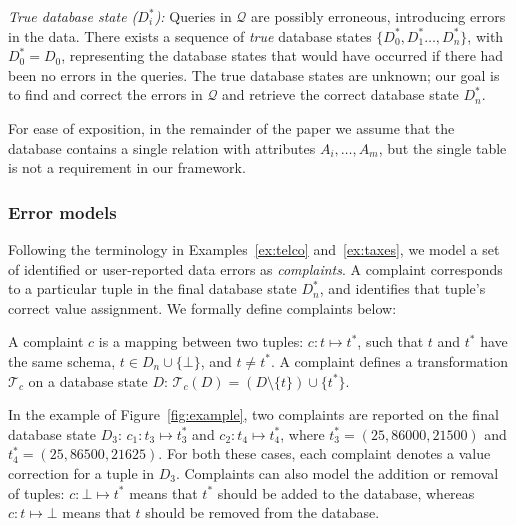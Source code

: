 \smallskip
\noindent
\emph{True database state ($D_i^*$):}
Queries in $\mathcal{Q}$ are possibly erroneous, introducing errors in the
data. There exists a sequence of \emph{true} database states $\{D_0^*,
D_1^*\dots, D_n^*\}$, with $D_0^*=D_0$, representing the database states that
would have occurred if there had been no errors in the queries.
The true database states are unknown; our goal is to find and correct the errors in $\mathcal{Q}$ and retrieve the correct database state $D_n^*$.

For ease of exposition, in the remainder of the paper we assume that the
database contains a single relation with attributes $A_i,\ldots,A_m$,
but the single table is not a requirement in our framework.


\subsubsection*{Error models}

Following the terminology in Examples~\ref{ex:telco}
and~\ref{ex:taxes}, we model a set of identified or user-reported
data errors as \emph{complaints}. A complaint corresponds to a
particular tuple in the final database state $D_n^*$, and identifies
that tuple's correct value assignment. We formally define complaints
below:

\begin{definition}[Complaint]
    A complaint $c$ is a mapping between two tuples: $c: t\mapsto t^*$, such that $t$ and $t^*$ have the same schema, $t\in D_n\cup\{\bot\}$, and $t\neq t^*$. A complaint defines a
    transformation $\mathcal{T}_c$ on a database state $D$: $\mathcal{T}_c(D)
    = (D\setminus\{t\})\cup\{t^*\}$.
\end{definition}

In the example of Figure~\ref{fig:example}, two complaints are reported on the final database state $D_3$: 
$c_1: t_3\mapsto t_3^*$ and
$c_2: t_4\mapsto t_4^*$, where $t_3^*=(25,86000,21500)$
and $t_4^*=(25,86500,21625)$.  For both these cases, each complaint denotes a value correction for a tuple in $D_3$.  Complaints can also model the addition or removal of tuples: $c: \bot\mapsto t^*$ means that $t^*$ should be added to the database, whereas $c: t\mapsto \bot$
means that $t$ should be removed from the database.


